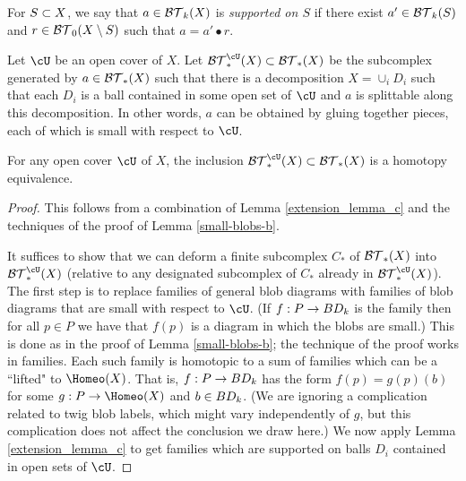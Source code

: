 For $S\subset X$, we say that $a\in {\mathcal{BT}}_k(X)$ is {\it supported on $S$}
if there exist $a'\in {\mathcal{BT}}_k(S)$
and $r\in {\mathcal{BT}}_0(X\setminus S)$ such that $a = a'\bullet r$.

\newcommand\sbtc{\btc^{\cU}}
Let $\cU$ be an open cover of $X$.
Let $\sbtc_*(X)\sub\btc_*(X)$ be the subcomplex generated by
$a\in {\mathcal{BT}}_*(X)$ such that there is a decomposition $X = \cup_i D_i$
such that each $D_i$ is a ball contained in some open set of $\cU$ and
$a$ is splittable along this decomposition.
In other words, $a$ can be obtained by gluing together pieces, each of which
is small with respect to $\cU$.

\begin{lemma} \label{small-top-blobs}
For any open cover $\cU$ of $X$, the inclusion $\sbtc_*(X)\sub\btc_*(X)$
is a homotopy equivalence.
\end{lemma}
\begin{proof}
This follows from a combination of Lemma \ref{extension_lemma_c} and the techniques of
the proof of Lemma \ref{small-blobs-b}.

It suffices to show that we can deform a finite subcomplex $C_*$ of ${\mathcal{BT}}_*(X)$ into $\sbtc_*(X)$
(relative to any designated subcomplex of $C_*$ already in $\sbtc_*(X)$).
The first step is to replace families of general blob diagrams with families 
of blob diagrams that are small with respect to $\cU$.
(If $f:P \to BD_k$ is the family then for all $p\in P$ we have that $f(p)$ is a diagram in which the blobs are small.)
This is done as in the proof of Lemma \ref{small-blobs-b}; the technique of the proof works in families.
Each such family is homotopic to a sum of families which can be a ``lifted" to $\Homeo(X)$.
That is, $f:P \to BD_k$ has the form $f(p) = g(p)(b)$ for some $g:P\to \Homeo(X)$ and $b\in BD_k$.
(We are ignoring a complication related to twig blob labels, which might vary
independently of $g$, but this complication does not affect the conclusion we draw here.)
We now apply Lemma \ref{extension_lemma_c} to get families which are supported 
on balls $D_i$ contained in open sets of $\cU$.
\end{proof}


